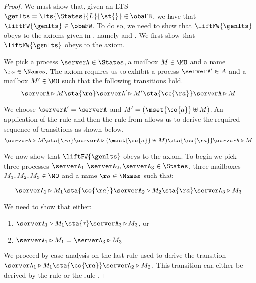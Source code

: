 \begin{proof}
  We must show that, given an LTS~$\genlts = \lts{\States}{L}{\st{}} \in \obaFB$, we have that
  $\liftFW{\genlts} \in \obaFW$.
  To do so, we need to show that $\liftFW{\genlts}$ obeys to the axioms given in ,
  namely \boom and \fwdfeedback.
  We first show that $\liftFW{\genlts}$ obeys to the \boom axiom.

  We pick a process $\serverA \in \States$, a mailbox $M \in \MO$ and a name $\aa \in \Names$.
  The axiom \boom requires us to exhibit a process $\serverA' \in A$ and a mailbox $M' \in \MO$ such that
  the following transitions hold.
  $$
  \serverA \triangleright M \sta{\aa} \serverA' \triangleright M' \sta{\co{\aa}} \serverA \triangleright M
  $$

  We choose $\serverA' = \serverA$ and $M' = (\mset{\co{a}} \uplus M)$.
  An application of the rule \stminplift and then the rule \stmoutlift from 
  allows us to derive the required sequence of transitions as shown below.
  $$
  \serverA \triangleright M \sta{\aa} \serverA \triangleright (\mset{\co{a}} \uplus M) \sta{\co{\aa}} \serverA \triangleright M
  $$

  We now show that $\liftFW{\genlts}$ obeys to the \fwdfeedback axiom.
  To begin we pick three processes $\serverA_1, \serverA_2, \serverA_3 \in \States$, three
  mailboxes $M_1, M_2, M_3 \in \MO$ and a name $\aa \in \Names$ such that:

  $$
  \serverA_1 \triangleright M_1 \sta{\co{\aa}} \serverA_2 \triangleright M_2  \sta{\aa} \serverA_3 \triangleright M_3
  $$

  We need to show that either:
  \begin{enumerate}
  \item $\serverA_1 \triangleright M_1 \sta{\tau} \serverA_3 \triangleright M_3$, or
  \item $\serverA_1 \triangleright M_1 \doteq \serverA_3 \triangleright M_3$
  \end{enumerate}

  We proceed by case analysis on the last rule used to derive the transition
  $\serverA_1 \triangleright M_1 \sta{\co{\aa}} \serverA_2 \triangleright M_2$.
  This transition can either be derived by the rule \stmoutlift or the rule \stproclift .


\end{proof}
